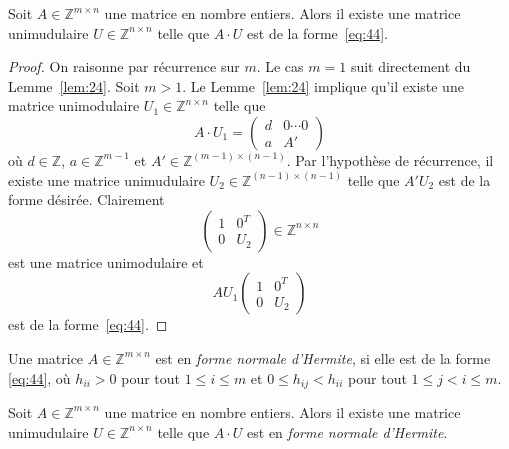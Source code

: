   \begin{corollary}
    \label{co:9}
    Soit  $A ∈ℤ^{ m ×n}$ une matrice en nombre entiers. Alors il  existe une matrice unimudulaire $U ∈ℤ^{ n ×n}$ telle que $A ⋅U$ est de la forme~\eqref{eq:44}.
  \end{corollary}
  \begin{proof}
    On raisonne par récurrence sur $m$. Le cas $m=1$ suit directement du Lemme~\ref{lem:24}. Soit $m>1$. 
    Le Lemme~\ref{lem:24} implique qu'il existe une matrice unimodulaire $U_1 ∈ℤ^{n ×n}$ telle que
    \begin{displaymath}
      A ⋅ U_1 =
      \begin{pmatrix}
        d & 0 \cdots 0 \\
        a  & A'
      \end{pmatrix}
    \end{displaymath}
    où $d ∈ℤ$, $a ∈ ℤ^{m-1}$ et $A' ∈ ℤ^{(m-1) × (n-1)}$. Par l'hypothèse de récurrence, il existe une matrice unimudulaire $U_2 ∈ℤ^{(n-1) ×(n-1)}$ telle que $A' U_2$ est de la forme désirée. Clairement
      \begin{displaymath}
         \begin{pmatrix}
          1 & 0^T \\
          0 & U_2
        \end{pmatrix} ∈ℤ^{n ×n}
      \end{displaymath}
      est une matrice unimodulaire et 
      \begin{displaymath}
        A U_1
        \begin{pmatrix}
          1 & 0^T \\
          0 & U_2
        \end{pmatrix}
      \end{displaymath}
      est de la  forme~\eqref{eq:44}. 
  \end{proof}



  \begin{definition}
    \label{def:49}
    Une matrice $A ∈ℤ^{m ×n}$  est en \emph{forme normale d'Hermite}, si elle est de la forme \eqref{eq:44}, où $h_{ii}>0$ pour tout $1 ≤i≤ m$ et $0≤ h_{ij} < h_{ii}$ pour tout $1≤j<i≤m$. 
  \end{definition}
	
\begin{theorem}
  \label{thr:28}
    Soit  $A ∈ℤ^{ m ×n}$ une matrice en nombre entiers. Alors il  existe une matrice unimudulaire $U ∈ℤ^{ n ×n}$ telle que $A ⋅U$ est en \emph{forme normale d'Hermite}.
  \end{theorem}
  
